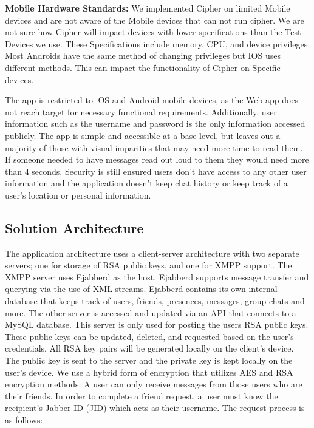 \documentclass[12pt]{article}
\begin{document}
\textbf{Mobile Hardware Standards:}
	We implemented Cipher on limited Mobile devices and are not aware of the Mobile devices that can not run cipher. We are not sure how Cipher will impact devices with lower specifications than the Test Devices we use. These Specifications include memory, CPU, and device privileges. Most Androids have the same method of changing privileges but IOS uses different methods. This can impact the functionality of Cipher on Specific devices. 

 The app is restricted to iOS and Android mobile devices, as the Web app does not reach target for necessary functional requirements. Additionally, user information such as the username and password is the only information accessed publicly. The app is simple and accessible at a base level, but leaves out a majority of those with visual imparities that may need more time to read them. If someone needed to have messages read out loud to them they would need more than 4 seconds. Security is still ensured users don’t have access to any other user information and the application doesn’t keep chat history or keep track of a user’s location or personal information.


\subsection{Solution Architecture}
The application architecture uses a client-server architecture with two separate servers; one for storage of RSA public keys, and one for XMPP support. The XMPP server uses Ejabberd as the host. Ejabberd supports message transfer and querying via the use of XML streams. Ejabberd contains its own internal database that keeps track of users, friends, presences, messages, group chats and more. The other server is accessed and updated via an API that connects to a MySQL database. This server is only used for posting the users RSA public keys. These public keys can be updated, deleted, and requested based on the user’s credentials. All RSA key pairs will be generated locally on the client's device. The public key is sent to the server and the private key is kept locally on the user’s device. We use a hybrid form of encryption that utilizes AES and RSA encryption methods. A user can only receive messages from those users who are their friends. In order to complete a friend request, a user must know the recipient’s Jabber ID (JID) which acts as their username. The request process is as follows:
\end{document}
